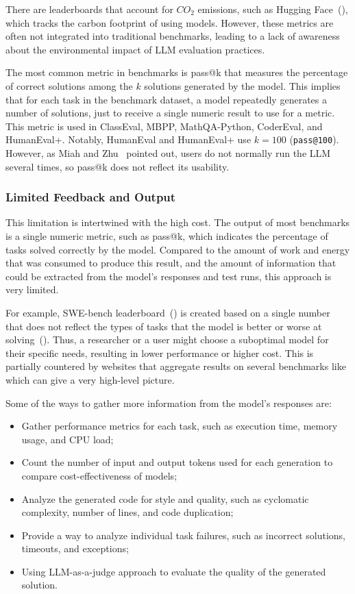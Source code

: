 There are leaderboards that account for $CO_2$ emissions, such as Hugging Face~(\cite{huggingfaceCalculation}), which tracks the carbon footprint of using models. However, these metrics are often not integrated into traditional benchmarks, leading to a lack of awareness about the environmental impact of LLM evaluation practices.

The most common metric in benchmarks is pass@k that measures the percentage of correct solutions among the $k$ solutions generated by the model.
This implies that for each task in the benchmark dataset, a model repeatedly generates a number of solutions, just to receive a single numeric result to use for a metric.
This metric is used in ClassEval, MBPP, MathQA-Python, CoderEval, and HumanEval+.
Notably, HumanEval and HumanEval+ use $k=100$ (\texttt{pass@100}).
However, as Miah and Zhu~\cite{miah2024usercentricevaluationcode} pointed out, users do not normally run the LLM several times, so pass@k does not reflect its usability.

\subsubsection{Limited Feedback and Output}

This limitation is intertwined with the high cost.
The output of most benchmarks is a single numeric metric, such as pass@k, which indicates the percentage of tasks solved correctly by the model.
Compared to the amount of work and energy that was consumed to produce this result, and the amount of information that could be extracted from the model's responses and test runs, this approach is very limited.

For example, SWE-bench leaderboard~(\cite{swebenchSWEbenchLeaderboards}) is created based on a single number that does not reflect the types of tasks that the model is better or worse at solving~(\cite{miah2024usercentricevaluationcode}).
Thus, a researcher or a user might choose a suboptimal model for their specific needs, resulting in lower performance or higher cost.
This is partially countered by websites that aggregate results on several benchmarks like~\cite{vellumLeaderboard2025} which can give a very high-level picture.

Some of the ways to gather more information from the model's responses are:
\begin{itemize}
    \item Gather performance metrics for each task, such as execution time, memory usage, and CPU load;
    \item Count the number of input and output tokens used for each generation to compare cost-effectiveness of models;
    \item Analyze the generated code for style and quality, such as cyclomatic complexity, number of lines, and code duplication;
    \item Provide a way to analyze individual task failures, such as incorrect solutions, timeouts, and exceptions;
    \item Using LLM-as-a-judge approach to evaluate the quality of the generated solution.
\end{itemize}

